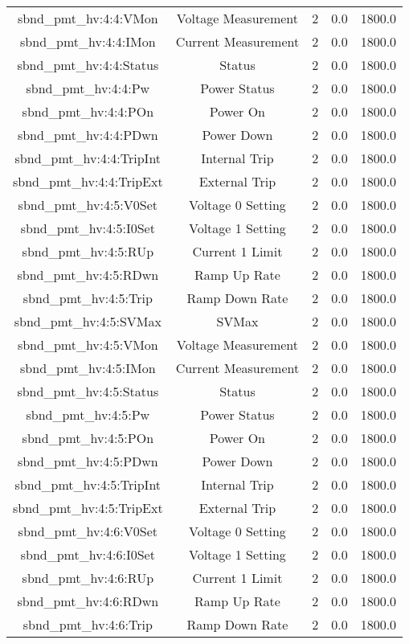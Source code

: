 \begin{table}[ptb]
\begin{tabular}{c | c c c c}
sbnd_pmt_hv:4:4:VMon & Voltage Measurement & 2 & 0.0 & 1800.0\\ 
sbnd_pmt_hv:4:4:IMon & Current Measurement & 2 & 0.0 & 1800.0\\ 
sbnd_pmt_hv:4:4:Status & Status & 2 & 0.0 & 1800.0\\ 
sbnd_pmt_hv:4:4:Pw & Power Status & 2 & 0.0 & 1800.0\\ 
sbnd_pmt_hv:4:4:POn & Power On & 2 & 0.0 & 1800.0\\ 
sbnd_pmt_hv:4:4:PDwn & Power Down & 2 & 0.0 & 1800.0\\ 
sbnd_pmt_hv:4:4:TripInt & Internal Trip & 2 & 0.0 & 1800.0\\ 
sbnd_pmt_hv:4:4:TripExt & External Trip & 2 & 0.0 & 1800.0\\ 
sbnd_pmt_hv:4:5:V0Set & Voltage 0 Setting & 2 & 0.0 & 1800.0\\ 
sbnd_pmt_hv:4:5:I0Set & Voltage 1 Setting & 2 & 0.0 & 1800.0\\ 
sbnd_pmt_hv:4:5:RUp & Current 1 Limit & 2 & 0.0 & 1800.0\\ 
sbnd_pmt_hv:4:5:RDwn & Ramp Up Rate & 2 & 0.0 & 1800.0\\ 
sbnd_pmt_hv:4:5:Trip & Ramp Down Rate & 2 & 0.0 & 1800.0\\ 
sbnd_pmt_hv:4:5:SVMax & SVMax & 2 & 0.0 & 1800.0\\ 
sbnd_pmt_hv:4:5:VMon & Voltage Measurement & 2 & 0.0 & 1800.0\\ 
sbnd_pmt_hv:4:5:IMon & Current Measurement & 2 & 0.0 & 1800.0\\ 
sbnd_pmt_hv:4:5:Status & Status & 2 & 0.0 & 1800.0\\ 
sbnd_pmt_hv:4:5:Pw & Power Status & 2 & 0.0 & 1800.0\\ 
sbnd_pmt_hv:4:5:POn & Power On & 2 & 0.0 & 1800.0\\ 
sbnd_pmt_hv:4:5:PDwn & Power Down & 2 & 0.0 & 1800.0\\ 
sbnd_pmt_hv:4:5:TripInt & Internal Trip & 2 & 0.0 & 1800.0\\ 
sbnd_pmt_hv:4:5:TripExt & External Trip & 2 & 0.0 & 1800.0\\ 
sbnd_pmt_hv:4:6:V0Set & Voltage 0 Setting & 2 & 0.0 & 1800.0\\ 
sbnd_pmt_hv:4:6:I0Set & Voltage 1 Setting & 2 & 0.0 & 1800.0\\ 
sbnd_pmt_hv:4:6:RUp & Current 1 Limit & 2 & 0.0 & 1800.0\\ 
sbnd_pmt_hv:4:6:RDwn & Ramp Up Rate & 2 & 0.0 & 1800.0\\ 
sbnd_pmt_hv:4:6:Trip & Ramp Down Rate & 2 & 0.0 & 1800.0\\ 

\end{tabular}
\end{table}
